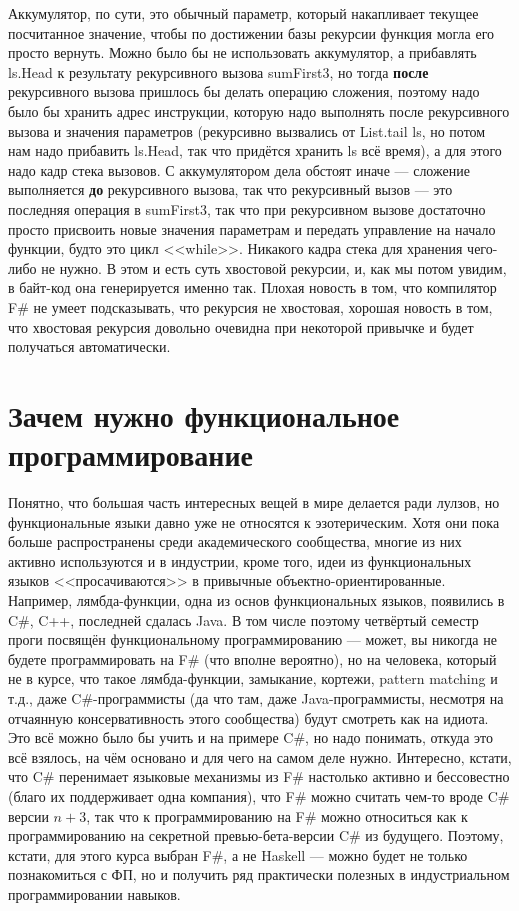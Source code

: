 \documentclass[a5paper]{article}
\begin{document}
Аккумулятор, по сути, это обычный параметр, который накапливает текущее посчитанное значение, чтобы по достижении базы рекурсии функция могла его просто вернуть. Можно было бы не использовать аккумулятор, а прибавлять ls.Head к результату рекурсивного вызова sumFirst3, но тогда \textbf{после} рекурсивного вызова пришлось бы делать операцию сложения, поэтому надо было бы хранить адрес инструкции, которую надо выполнять после рекурсивного вызова и значения параметров (рекурсивно вызвались от List.tail ls, но потом нам надо прибавить ls.Head, так что придётся хранить ls всё время), а для этого надо кадр стека вызовов. С аккумулятором дела обстоят иначе --- сложение выполняется \textbf{до} рекурсивного вызова, так что рекурсивный вызов --- это последняя операция в sumFirst3, так что при рекурсивном вызове достаточно просто присвоить новые значения параметрам и передать управление на начало функции, будто это цикл <<while>>. Никакого кадра стека для хранения чего-либо не нужно. В этом и есть суть хвостовой рекурсии, и, как мы потом увидим, в байт-код она генерируется именно так. Плохая новость в том, что компилятор F\# не умеет подсказывать, что рекурсия не хвостовая, хорошая новость в том, что хвостовая рекурсия довольно очевидна при некоторой привычке и будет получаться автоматически.

\section{Зачем нужно функциональное программирование}

Понятно, что большая часть интересных вещей в мире делается ради лулзов, но функциональные языки давно уже не относятся к эзотерическим. Хотя они пока больше распространены среди академического сообщества, многие из них активно используются и в индустрии, кроме того, идеи из функциональных языков <<просачиваются>> в привычные объектно-ориентированные. Например, лямбда-функции, одна из основ функциональных языков, появились в C\#, C++, последней сдалась Java. В том числе поэтому четвёртый семестр проги посвящён функциональному программированию --- может, вы никогда не будете программировать на F\# (что вполне вероятно), но на человека, который не в курсе, что такое лямбда-функции, замыкание, кортежи, pattern matching и т.д., даже C\#-программисты (да что там, даже Java-программисты, несмотря на отчаянную консервативность этого сообщества) будут смотреть как на идиота. Это всё можно было бы учить и на примере C\#, но надо понимать, откуда это всё взялось, на чём основано и для чего на самом деле нужно. Интересно, кстати, что C\# перенимает языковые механизмы из F\# настолько активно и бессовестно (благо их поддерживает одна компания), что F\# можно считать чем-то вроде C\# версии $n + 3$, так что к программированию на F\# можно относиться как к программированию на секретной превью-бета-версии C\# из будущего. Поэтому, кстати, для этого курса выбран F\#, а не Haskell --- можно будет не только познакомиться с ФП, но и получить ряд практически полезных в индустриальном программировании навыков.
\end{document}
